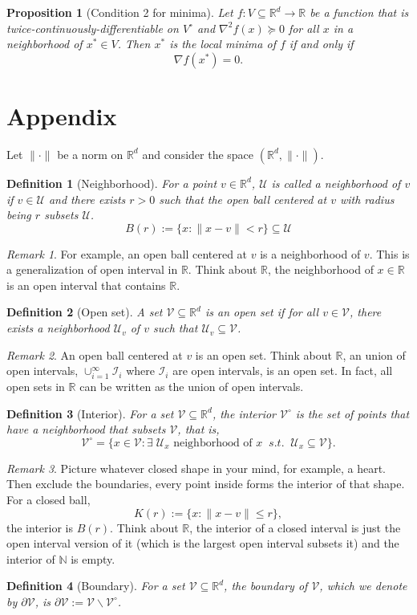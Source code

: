 \documentclass{article}
\newtheorem{definition}{Definition}
\newtheorem{proposition}{Proposition}
\newcommand{\R}{\mathbb{R}}
\newcommand{\N}{\mathbb{N}}
\DeclareMathOperator*{\1}{\mathbbm{1}}
\theoremstyle{definition}
\theoremstyle{remark}
\newtheorem{remark}{Remark}
\newcommand{\cU}{\mathcal{U}}
\newcommand{\cV}{\mathcal{V}}
\newcommand{\cI}{\mathcal{I}}
\begin{document}
  \begin{proposition}[Condition 2 for minima]
    Let $f:V\subseteq \R^d \to \R$ be a function that is twice-continuously-differentiable on $V^\circ$ and $\nabla^2 f(x)\succeq 0$ for all $x$ in a neighborhood of $x^*\in V$. Then $x^*$ is the local minima of $f$ if and only if 
    \begin{equation*}
      \nabla f(x^*)=0.
    \end{equation*}
  \end{proposition}
  \section{Appendix}
  Let $\|\cdot\|$ be a norm on $\R^d$ and consider the space $(\R^d, \|\cdot\|)$. 
  \begin{definition}[Neighborhood]
    For a point $v\in \R^d$, $\cU$ is called a neighborhood of $v$ if $v\in \cU$ and there exists $r>0$ such that the open ball centered at $v$ with radius being $r$ subsets $\cU$. 
  \[B(r):=\{x:\|x-v\|<r\}\subseteq \cU\]
  \end{definition}
  \begin{remark}
    For example, an open ball centered at $v$ is a neighborhood of $v$. This is a generalization of open interval in $\R$. Think about $\R$, the neighborhood of $x\in \R$ is an open interval that contains $\R$.
  \end{remark}
  \begin{definition}[Open set]
    A set $\cV\subseteq \R^d$ is an open set if for all $v\in \cV$, there exists a neighborhood $\cU_v$ of $v$ such that $\cU_v\subseteq \cV$.
  \end{definition}
  \begin{remark}
    An open ball centered at $v$ is an open set. Think about $\R$, an union of open intervals, $\cup_{i=1}^\infty \cI_i$ where $\cI_i$ are open intervals, is an open set. In fact, all open sets in $\R$ can be written as the union of open intervals.
  \end{remark}
  \begin{definition}[Interior]
    For a set $\cV\subseteq\R^d$, the interior $\cV^\circ$ is the set of points that have a neighborhood that subsets $\cV$, that is,
    \[\cV^\circ = \{x\in \cV: \exists 
    \;\cU_x \text{ neighborhood of }x \;\; s.t. \;\;\cU_x\subseteq\cV\}.\]
  \end{definition} 
  \begin{remark}
    Picture whatever closed shape in your mind, for example, a heart. Then exclude the boundaries, every point inside forms the interior of that shape. For a closed ball, \[K(r):=\{x:\|x-v\|\le r\},\]
    the interior is $B(r)$. Think about $\R$, the interior of a closed interval is just the open interval version of it (which is the largest open interval subsets it) and the interior of $\N$ is empty.
  \end{remark}

  \begin{definition}[Boundary]
    For a set $\cV\subseteq\R^d$, the boundary of $\cV$, which we denote by $\partial \cV$, is $\partial \cV := \cV\backslash \cV^\circ$.
  \end{definition}

  
\end{document}
